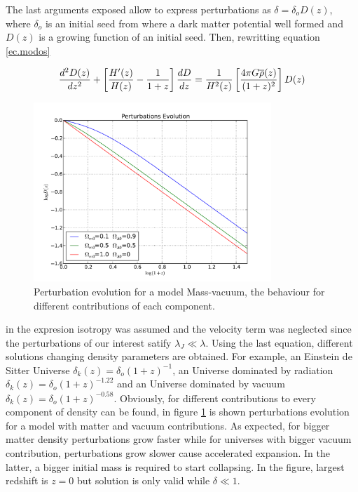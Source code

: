 The last arguments exposed allow to express perturbations as $\delta = \delta_oD(z)$,
where $\delta_o$ is an initial seed from where a dark matter potential well formed
and $D(z)$ is a growing function of an initial seed.
Then, rewritting equation \ref{ec.modos}  

\[
\frac{d^2D(z)}{dz^2}+\left[ \frac{H'(z)}{H(z)} -\frac{1}{1+z}\right]\frac{d D}{d z}
= \frac{1}{H^2(z)}\left[ \frac{4\pi G\overline{\rho}(z)}{(1+z)^2} \right]D(z)
\]

\begin{figure}[htbp]
       \centering
               \includegraphics[width=0.8\textwidth]{Images/chapter2/masavacio.pdf}
       \caption{\small Perturbation evolution for a model Mass-vacuum, the behaviour
       for different contributions of each component. }
       \label{masavacio}
 \end{figure}

in the expresion isotropy was assumed and the velocity term was neglected
since the perturbations of our interest satify $\lambda_J \ll \lambda$.
Using the last equation, different solutions changing density parameters
are obtained. For example, an Einstein de Sitter Universe  $\delta_k(z)=\delta_o(1+z)^{-1}$,  
an Universe dominated by radiation $\delta_k(z)=\delta_o(1+z)^{-1.22}$ and
an Universe dominated by vacuum $\delta_k(z)=\delta_o(1+z)^{-0.58}$. 
Obviously, for different contributions to every component of density can be found,
in figure \ref{masavacio} is shown perturbations evolution for a model with
matter and vacuum contributions. As expected, for bigger matter density
perturbations grow faster while for universes with bigger vacuum contribution, 
perturbations grow slower cause accelerated expansion. In the latter, a bigger
initial mass is required to start collapsing. In the figure, largest redshift
is $z=0$ but solution is only valid while $\delta\ll 1$. 

